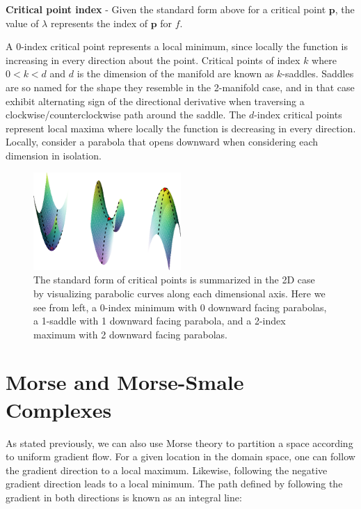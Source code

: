 \begin{defn}
\textbf{Critical point index} - Given the standard form above for a critical point $\mathbf{p}$, the value of $\lambda$ represents the index of $\mathbf{p}$ for $f$.
\end{defn}

A 0-index critical point represents a local minimum, since locally the function is increasing in every direction about the point. Critical points of index $k$ where $0 < k < d$ and $d$ is the dimension of the manifold are known as $k$-saddles.
%
Saddles are so named for the shape they resemble in the 2-manifold case, and in that case exhibit alternating sign of the directional derivative when traversing a clockwise/counterclockwise path around the saddle.
%
The $d$-index critical points represent local maxima where locally the function is decreasing in every direction. Locally, consider a parabola that opens downward when considering each dimension in isolation.

\begin{figure}[!ht]
  \centering
  \includegraphics[width=0.5\textwidth]{figs/chap4/criticalPoints}
  \caption[Critical Points of Varying Index]{The standard form of critical points is summarized in the 2D case by visualizing parabolic curves along each dimensional axis. Here we see from left, a 0-index minimum with 0 downward facing parabolas, a 1-saddle with 1 downward facing parabola, and a 2-index maximum with 2 downward facing parabolas.}
  \label{fig:topo-structure}
\end{figure}

\section{Morse and Morse-Smale Complexes}

As stated previously, we can also use Morse theory to partition a space according to uniform gradient flow.
%
For a given location in the domain space, one can follow the gradient direction to a local maximum.
%
Likewise, following the negative gradient direction leads to a local minimum.
%
The path defined by following the gradient in both directions is known as an integral line:

